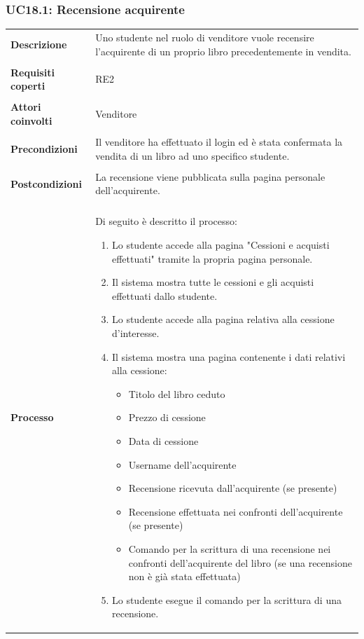 \documentclass[10pt,a4paper]{report}
\begin{document}
	\subsubsection{UC18.1: Recensione acquirente}
	\begin{tabular}{lp{}}
		\textbf{Descrizione}&Uno studente nel ruolo di venditore vuole recensire l'acquirente di un proprio libro precedentemente in vendita.\\
		\\
		\textbf{Requisiti coperti}&RE2\\
		\\
		\textbf{Attori coinvolti}&Venditore\\
		\\
		\textbf{Precondizioni}&Il venditore ha effettuato il login ed è stata confermata la vendita di un libro ad uno specifico studente.\\
		\\
		\textbf{Postcondizioni}&La recensione viene pubblicata sulla pagina personale dell'acquirente.\\
		\\
		\textbf{Processo}&Di seguito è descritto il processo:
		\begin{enumerate}
			\item Lo studente accede alla pagina "Cessioni e acquisti effettuati" tramite la propria pagina personale.
			\item Il sistema mostra tutte le cessioni e gli acquisti effettuati dallo studente.
			\item Lo studente accede alla pagina relativa alla cessione d'interesse.
			\item Il sistema mostra una pagina contenente i dati relativi alla cessione:
			\begin{itemize}
				\item Titolo del libro ceduto
				\item Prezzo di cessione
				\item Data di cessione
				\item Username dell'acquirente
				\item Recensione ricevuta dall'acquirente (se presente)
				\item Recensione effettuata nei confronti dell'acquirente (se presente)
				\item Comando per la scrittura di una recensione nei confronti dell'acquirente del libro (se una recensione non è già stata effettuata)
			\end{itemize}
			\item Lo studente esegue il comando per la scrittura di una recensione.

\end{enumerate}
\end{tabular}
\end{document}
